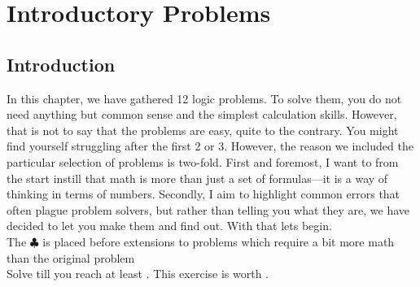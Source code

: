 \chapter{Introductory Problems}
\section{Introduction}
In this chapter, we have gathered 12 logic problems. To solve them, you do not need anything but common sense and the simplest calculation skills. However, that is not to say that the problems are easy, quite to the contrary. You might find yourself struggling after the first 2 or 3. However, the reason we included the particular selection of problems is two-fold. First and foremost, I want to from the start instill that math is more than just a set of formulas—it is a way of thinking in terms of numbers. Secondly, I aim to highlight common errors that often plague problem solvers, but rather than telling you what they are, we have decided to let you make them and find out. With that lets begin.\\
 The $\clubsuit$ is placed before extensions to problems which require a bit more math than the original problem\\
Solve till you reach at least . This exercise is worth . 
